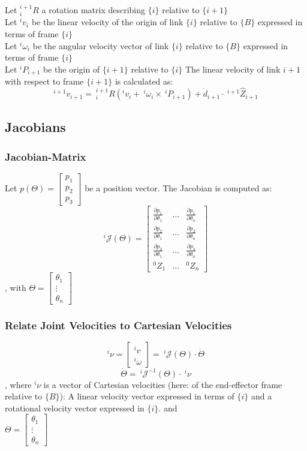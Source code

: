 \documentclass[10pt,a4paper]{article}
\newcommand{\vect}[1]{\ensuremath{\begin{bmatrix}#1\end{bmatrix}}}
\begin{document}
Let $^{i+1}_iR$ a rotation matrix describing $\{i\}$ relative to $\{i+1\}$ \\
Let $^iv_i$ be the linear velocity of the origin of link $\{i\}$ relative to $\{B\}$ expressed in terms of frame $\{i\}$ \\
Let $^i\omega_i$ be the angular velocity vector of link $\{i\}$ relative to $\{B\}$ expressed in terms of frame $\{i\}$ \\
Let $^iP_{i+1}$ be the origin of $\{i+1\}$ relative to $\{i\}$
The linear velocity of link $i + 1$ with respect to frame $\{i + 1\}$ is calculated as:
$$
^{i+1}v_{i+1} = ~^{i+1}_iR(^iv_i + ~^i\omega_i \times ~^iP_{i+1}) + \dot{d}_{i+1} ⋅ ~^{i+1}\hat{Z}_{i+1}
$$

\subsection{Jacobians}
\subsubsection{Jacobian-Matrix}
Let $p(\Theta) = \vect{p_1 \\ p_2 \\ p_3}$ be a position vector.
The Jacobian is computed as: \\
$$
^i\mathcal{J}(\Theta) = \begin{bmatrix}
\frac{\partial p_1}{\partial \theta_1} & \dots & \frac{\partial p_1}{\partial \theta_n} \\
\frac{\partial p_2}{\partial \theta_1} & \dots & \frac{\partial p_2}{\partial \theta_n} \\
\frac{\partial p_3}{\partial \theta_1} & \dots & \frac{\partial p_3}{\partial \theta_n} \\
^0Z_1 & \dots & ^0Z_n
\end{bmatrix}
$$
, with $\Theta = \vect{\theta_1 \\ \vdots \\ \theta_n}$



\subsubsection{Relate Joint Velocities to Cartesian Velocities}
$$
^i\nu = \vect{^iv \\ ^i\omega} = ~^i\mathcal{J}(\Theta) ⋅ \dot{\Theta}
$$
$$
	\dot{\Theta} = ~^i\mathcal{J}^{-1}(\Theta) ⋅ ~^i\nu
$$
, where $^i\nu$ is a vector of Cartesian velocities (here: of the end-effector frame relative to $\{B\}$): A linear velocity vector expressed in terms of $\{i\}$ and a rotational velocity vector expressed in $\{i\}$. and \\
$\Theta = \vect{\theta_1 \\ \vdots \\ \theta_n}$ \\
\end{document}
